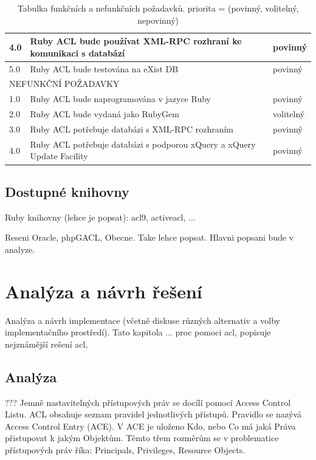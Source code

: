 \documentclass[11pt,twoside,a4paper]{book}
\begin{document}
\begin{table}
\begin{center}
\begin{tabular}{|l|p{9cm}|l|}
\hline
4.0 & Ruby ACL bude používat XML-RPC rozhraní ke komunikaci s databází & povinný\\
\hline
5.0 & Ruby ACL bude testována na eXist DB & povinný\\
\hline
\multicolumn{3}{|l|}{NEFUNKČNÍ POŽADAVKY} \\
\hline
1.0 & Ruby ACL bude naprogramována v jazyce Ruby & povinný \\
\hline
2.0 & Ruby ACL bude vydaná jako RubyGem & volitelný\\
\hline
3.0 & Ruby ACL potřebuje databázi s XML-RPC rozhraním & povinný\\
\hline
4.0 & Ruby ACL potřebuje databázi s podporou xQuery a xQuery Update Facility & povinný\\
\hline
\end{tabular}
\end{center}
\caption{Tabulka funkčních a nefunkčních požadavků. priorita = (povinný, volitelný, nepovinný)}
\label{tab:tab1}
\end{table}

\section{Dostupné knihovny}

Ruby knihovny (lehce je popsat): acl9, activeacl, ... 

Reseni Oracle, phpGACL, Obecne. Take lehce popsat. Hlavni popsani bude v analyze.



\chapter{Analýza a návrh řešení}
Analýza a návrh implementace (včetně diskuse různých alternativ a volby implementačního prostředí).
Tato kapitola ... proc pomoci acl, popisuje nejznámější rešení acl, 
\section{Analýza}

???
Jemně nastavitelných přístupových práv se docílí pomocí Access Control Listu. ACL obsahuje seznam pravidel jednotlivých přístupů. Pravidlo se nazývá Access Control Entry (ACE). V ACE je uloženo Kdo, nebo Co má jaká Práva přistupovat k jakým Objektům. Těmto třem rozměrům se v problematice přístupových práv říka: Principals, Privileges, Resource Objects.
\end{document}
